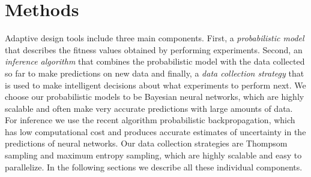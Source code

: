 \section{Methods}

Adaptive design tools include three main components. First, a
\emph{probabilistic model} that describes the fitness values obtained by
performing experiments. Second, an \emph{inference algorithm} that combines the
probabilistic model with the data collected so far to make predictions on new
data and finally, a \emph{data collection strategy} that is used to make
intelligent decisions about what experiments to perform next. We choose our
probabilistic models to be Bayesian neural networks, which are highly scalable
and often make very accurate predictions with large amounts of data. For
inference we use the recent algorithm probabilistic backpropagation, which has low computational cost and produces accurate
estimates of uncertainty in the predictions of neural networks. Our data collection strategies are Thompsom sampling and maximum entropy sampling, which are highly scalable and easy to parallelize.
In the following sections we describe all these individual components.





